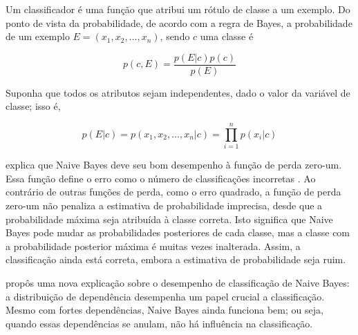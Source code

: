 


Um classificador é uma função que atribui um rótulo de classe a um exemplo. Do ponto de vista da probabilidade, de acordo com a regra de Bayes, a probabilidade de um exemplo $E = (x_1, x_2, \dots, x_n)$, sendo $c$ uma classe é


\begin{equation}
p(c,E) = \frac{p(E|c)p(c)}{p(E)}
\end{equation} 

Suponha que todos os atributos sejam independentes, dado o valor da variável de classe; isso é,

\begin{equation}
p(E|c) = p(x_1, x_2, \dots, x_n|c) = \prod_{i=1}^{n} p(x_i|c)
\end{equation}

 explica que Naive Bayes deve seu bom desempenho à função de perda zero-um. Essa função define o erro como o número de classificações incorretas . Ao contrário de outras funções de perda, como o erro quadrado, a função de perda zero-um não penaliza a estimativa de probabilidade imprecisa, desde que a probabilidade máxima seja atribuída à classe correta. Isto significa que Naive Bayes pode mudar as probabilidades posteriores de cada classe, mas a classe com a probabilidade posterior máxima é muitas vezes inalterada. Assim, a classificação ainda está correta, embora a estimativa de probabilidade seja ruim.


\cite{zhang2004} propôs uma nova explicação sobre o desempenho de classificação de Naive Bayes: a distribuição de dependência desempenha um papel crucial a classificação. Mesmo com fortes dependências, Naive Bayes ainda funciona bem; ou seja, quando essas dependências se anulam, não há influência na classificação. %



